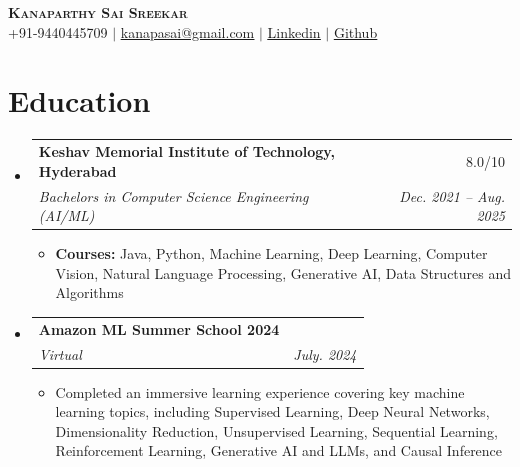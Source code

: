 \documentclass[letterpaper,11pt]{article}
\makeatletter
\newcommand{\resumeItem}[1]{
  \item\small{
    {#1 \vspace{-2pt}}
  }
}
\newcommand{\resumeSubheading}[4]{
  \vspace{-2pt}\item
    \begin{tabular*}{0.97\textwidth}[t]{l@{\extracolsep{\fill}}r}
      \textbf{#1} & #2 \\
      \textit{\small#3} & \textit{\small #4} \\
    \end{tabular*}\vspace{-7pt}
}
\newcommand{\resumeProjectHeading}[2]{
    \item
    \begin{tabular*}{0.97\textwidth}{l@{\extracolsep{\fill}}r}
      \small#1 & #2 \\
    \end{tabular*}\vspace{-7pt}
}
\newcommand{\resumeSubHeadingListStart}{\begin{itemize}[leftmargin=0.15in, label={}]}
\newcommand{\resumeSubHeadingListEnd}{\end{itemize}}
\newcommand{\resumeItemListStart}{\begin{itemize}}
\newcommand{\resumeItemListEnd}{\end{itemize}\vspace{-5pt}}
\makeatother
\begin{document}
\begin{center}
    \textbf{\Huge \scshape \textcolor{blue(pigment)}{Kanaparthy Sai Sreekar}} \\ \vspace{7pt}
    \small +91-9440445709 $|$ \href{mailto:kanapasai@gmail.com}{\underline{kanapasai@gmail.com}} $|$ 
    \href{https://www.linkedin.com/in/saisreekarkanaparthy/}{\underline{Linkedin}} $|$
    \href{https://github.com/KanaparthySaiSreekar}{\underline{Github}}
\end{center}

\section{\textcolor{blue(pigment)}{Education}}
  \resumeSubHeadingListStart
    \resumeSubheading
      {Keshav Memorial Institute of Technology, Hyderabad}{8.0/10}
      {Bachelors in Computer Science Engineering (AI/ML)}{Dec. 2021 -- Aug. 2025}
      \resumeItemListStart
        \resumeItem{\textbf{Courses:} Java, Python, Machine Learning, Deep Learning, Computer Vision, Natural Language Processing, Generative AI, Data Structures and Algorithms}
      \resumeItemListEnd
    \resumeSubheading
      {Amazon ML Summer School 2024}{}
      {Virtual}{July. 2024}
      \resumeItemListStart
       \resumeItem{ Completed an immersive learning experience covering key machine learning topics, including Supervised Learning,
     Deep Neural Networks, Dimensionality Reduction, Unsupervised Learning, Sequential Learning, Reinforcement
     Learning, Generative AI and LLMs, and Causal Inference}
      \resumeItemListEnd
  \resumeSubHeadingListEnd




\end{document}
